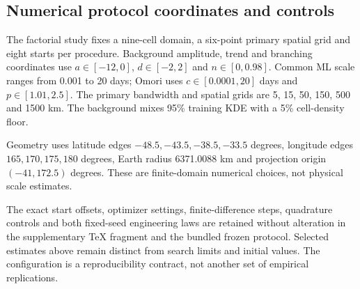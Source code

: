 \subsection{Numerical protocol coordinates and controls}
\label{app:audit10-protocol}
The factorial study fixes a nine-cell domain, a six-point primary spatial grid and eight starts per procedure. Background amplitude, trend and branching coordinates use $a\in[-12,0]$, $d\in[-2,2]$ and $n\in[0,0.98]$. Common ML scale ranges from 0.001 to 20 days; Omori uses $c\in[0.0001,20]$ days and $p\in[1.01,2.5]$. The primary bandwidth and spatial grids are 5, 15, 50, 150, 500 and 1500 km. The background mixes 95\% training KDE with a 5\% cell-density floor.

Geometry uses latitude edges $-48.5,-43.5,-38.5,-33.5$ degrees, longitude edges $165,170,175,180$ degrees, Earth radius 6371.0088 km and projection origin $(-41,172.5)$ degrees. These are finite-domain numerical choices, not physical scale estimates.

The exact start offsets, optimizer settings, finite-difference steps, quadrature controls and both fixed-seed engineering laws are retained without alteration in the supplementary TeX fragment  and the bundled frozen protocol. Selected estimates above remain distinct from search limits and initial values. The configuration is a reproducibility contract, not another set of empirical replications.

